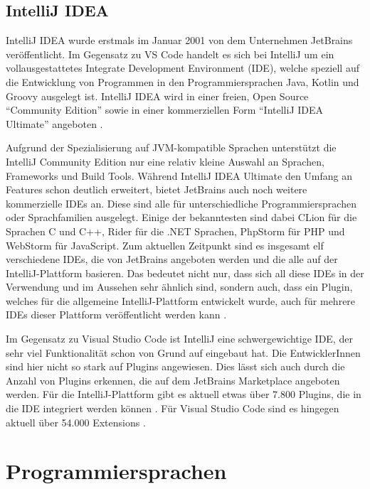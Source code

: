 \subsection{IntelliJ IDEA}

IntelliJ IDEA wurde erstmals im Januar 2001 \cite{IntelliJReleasePage}
von dem Unternehmen 
JetBrains veröffentlicht. Im Gegensatz zu VS Code handelt 
es sich bei IntelliJ um ein vollausgestattetes Integrate Development Environment (IDE),
welche speziell auf die Entwicklung 
von Programmen in den Programmiersprachen Java, Kotlin und Groovy ausgelegt ist. 
IntelliJ IDEA wird in einer freien, Open Source 
\enquote{Community Edition} \cite{IntelliJCommunityEditionGithub} sowie in einer kommerziellen Form 
\enquote{IntelliJ IDEA Ultimate} angeboten \cite{HagosTed2022BII:}. 

Aufgrund der Spezialisierung auf JVM-kompatible Sprachen unterstützt 
die IntelliJ Community Edition nur eine relativ kleine Auswahl an 
Sprachen, Frameworks und Build Tools. Während IntelliJ IDEA Ultimate 
den Umfang an Features schon deutlich erweitert, bietet JetBrains auch 
noch weitere kommerzielle IDEs an. Diese sind alle für unterschiedliche 
Programmiersprachen oder Sprachfamilien ausgelegt. Einige der bekanntesten 
sind dabei CLion für die Sprachen C und C++, Rider für die .NET Sprachen, 
PhpStorm für PHP und WebStorm für JavaScript. Zum aktuellen 
Zeitpunkt sind es insgesamt elf verschiedene IDEs, die von JetBrains 
angeboten werden und die alle auf der IntelliJ-Plattform basieren. Das 
bedeutet nicht nur, dass sich all diese IDEs in der Verwendung und im 
Aussehen sehr ähnlich sind, sondern auch, dass ein Plugin, welches für 
die allgemeine IntelliJ-Plattform entwickelt wurde, 
auch für mehrere IDEs dieser Plattform veröffentlicht werden kann \cite{IntelliJSDKDocumentation}.

Im Gegensatz zu Visual Studio Code ist IntelliJ eine schwergewichtige
IDE, der sehr viel Funktionalität schon von Grund auf eingebaut 
hat. Die EntwicklerInnen sind hier nicht so stark auf Plugins angewiesen.
Dies lässt sich auch durch die Anzahl von Plugins erkennen, die auf dem 
JetBrains Marketplace angeboten werden. Für die IntelliJ-Plattform gibt 
es aktuell etwas über 7.800 Plugins, die in die IDE integriert werden können 
\cite{IntelliJMarketplace}.
Für Visual Studio Code sind es hingegen aktuell über 54.000 Extensions
\cite{VSCodeMarketplace}.


\section{Programmiersprachen}
\label{sec:Programmiersprachen}

